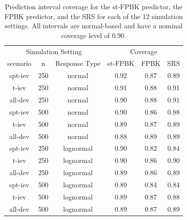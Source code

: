 \documentclass[]{interact}
\theoremstyle{plain}%
\theoremstyle{definition}
\theoremstyle{remark}
\begin{document}
\begin{table}[H]

\caption{\label{tab:simpitab}Prediction interval coverage for the st-FPBK predictor, the FPBK predictor, and the SRS for each of the 12 simulation settings. All intervals are normal-based and have a nominal coverage level of 0.90.}
\centering
\begin{tabular}[t]{cccccc}
\toprule
\multicolumn{3}{c}{Simulation Setting} & \multicolumn{3}{c}{Coverage} \\
\cmidrule(l{3pt}r{3pt}){1-3} \cmidrule(l{3pt}r{3pt}){4-6}
scenario & n & Response Type & st-FPBK & FPBK & SRS\\
\midrule
spt-iev & 250 & normal & 0.92 & 0.87 & 0.89\\
t-iev & 250 & normal & 0.91 & 0.88 & 0.91\\
all-dev & 250 & normal & 0.90 & 0.88 & 0.91\\
\midrule
spt-iev & 500 & normal & 0.90 & 0.86 & 0.88\\
t-iev & 500 & normal & 0.89 & 0.87 & 0.89\\
all-dev & 500 & normal & 0.88 & 0.89 & 0.89\\
\midrule
spt-iev & 250 & lognormal & 0.90 & 0.82 & 0.84\\
t-iev & 250 & lognormal & 0.90 & 0.86 & 0.90\\
all-dev & 250 & lognormal & 0.89 & 0.86 & 0.89\\
\midrule
spt-iev & 500 & lognormal & 0.89 & 0.84 & 0.84\\
t-iev & 500 & lognormal & 0.89 & 0.87 & 0.88\\
all-dev & 500 & lognormal & 0.89 & 0.87 & 0.89\\
\bottomrule
\end{tabular}
\end{table}



\end{document}
